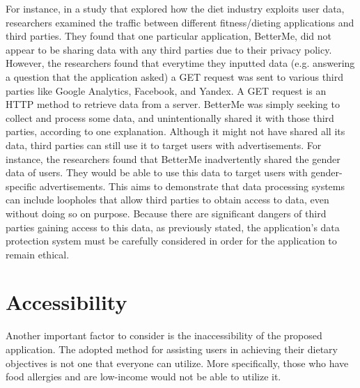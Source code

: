 \documentclass[10pt,twocolumn]{article}
\begin{document}
For instance, in a study that explored how the diet industry exploits user data, researchers examined the traffic between different fitness/dieting applications and third parties.\cite{privacy_international_2021} They found that one particular application, BetterMe, did not appear to be sharing data with any third parties due to their privacy policy. However, the researchers found that everytime they inputted data (e.g. answering a question that the application asked) a GET request was sent to various third parties like Google Analytics, Facebook, and Yandex. A GET request is an HTTP method to retrieve data from a server. BetterMe was simply seeking to collect and process some data, and unintentionally shared it with those third parties, according to one explanation. Although it might not have shared all its data, third parties can still use it to target users with advertisements. For instance, the researchers found that BetterMe inadvertently shared the gender data of users. They would be able to use this data to target users with gender-specific advertisements. This aims to demonstrate that data processing systems can include loopholes that allow third parties to obtain access to data, even without doing so on purpose. Because there are significant dangers of third parties gaining access to this data, as previously stated, the application's data protection system must be carefully considered in order for the application to remain ethical. 

\section{Accessibility}
Another important factor to consider is the inaccessibility of the proposed application. The adopted method for assisting users in achieving their dietary objectives is not one that everyone can utilize. More specifically, those who have food allergies and are low-income would not be able to utilize it. 
\end{document}
